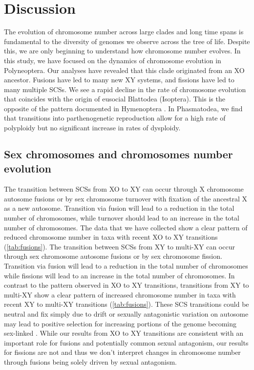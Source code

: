 \section{Discussion}

The evolution of chromosome number across large clades and long time spans is fundamental to the diversity of genomes we observe across the tree of life.
Despite this, we are only beginning to understand how chromosome number evolves.
In this study, we have focused on the dynamics of chromosome evolution in Polyneoptera. 
Our analyses have revealed that this clade originated from an XO ancestor. 
Fusions have led to many new XY systems, and fissions have led to many multiple SCSs.
We see a rapid decline in the rate of chromosome evolution that coincides with the origin of eusocial Blattodea (Isoptera).
This is the opposite of the pattern documented in Hymenoptera \citep{ross2015}.
In Phasmatodea, we find that transitions into parthenogenetic reproduction allow for a high rate of polyploidy but no significant increase in rates of dysploidy.

\subsection{Sex chromosomes and chromosomes number evolution}
The transition between SCSs from XO to XY can occur through X chromosome autosome fusions or by sex chromosome turnover with fixation of the ancestral X as a new autosome.
Transition via fusion will lead to a reduction in the total number of chromosomes, while turnover should lead to an increase in the total number of chromosomes.
The data that we have collected show a clear pattern of reduced chromosome number in taxa with recent XO to XY transitions (\cref{tab:fusions}).
The transition between SCSs from XY to multi-XY can occur through sex chromosome autosome fusions or by sex chromosome fission.
Transition via fusion will lead to a reduction in the total number of chromosomes while fissions will lead to an increase in the total number of chromosomes.
In contrast to the pattern observed in XO to XY transitions, transitions from XY to multi-XY show a clear pattern of increased chromosome number in taxa with recent XY to multi-XY transitions (\cref{tab:fusions}).
These SCS transitions could be neutral and fix simply due to drift or sexually antagonistic variation on autosome may lead to positive selection for increasing portions of the genome becoming sex-linked \citep{charlesworth1980, kitano2012}.
While our results from XO to XY transitions are consistent with an important role for fusions and potentially common sexual antagonism, our results for fissions are not and thus we don't interpret changes in chromosome number through fusions being solely driven by sexual antagonism. 

